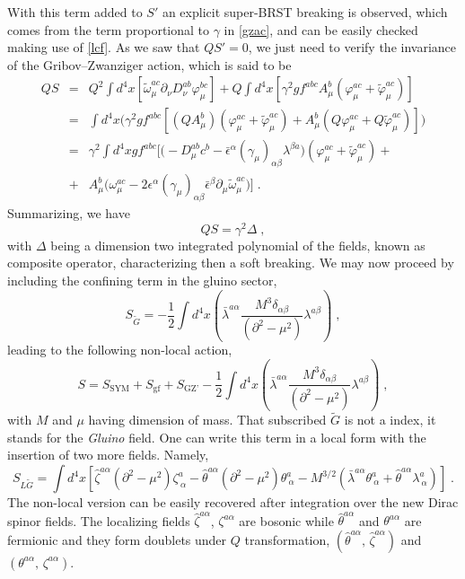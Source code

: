 \begin{appendix}
\noindent With this term added to $S'$ an explicit super-BRST breaking is observed, which comes from the term proportional to $\gamma$ in \eqref{gzac}, and can be easily checked making use of \eqref{lcf}. As we saw that $QS'=0$, we just need to verify the invariance of the Gribov--Zwanziger action, which is said to be
\begin{eqnarray}
 QS&=&Q^{2}\int d^{4}x \left[\tilde{\omega}^{ac}_{\mu}\partial_{\nu}D_{\nu}^{ab}\varphi^{bc}_{\mu} \right]+Q\int d^{4}x \left[\gamma^{2}gf^{abc}A^{b}_{\mu}(\varphi^{ac}_{\mu}+\tilde{\varphi}^{ac}_{\mu})\right]\nonumber\\
&=&\int d^4x \Big(\gamma^2gf^{abc}\left[(QA_\mu^b)(\varphi^{ac}_\mu+\tilde{\varphi}^{ac}_{\mu})+A_\mu^b(Q\varphi^{ac}_\mu+
Q\tilde{\varphi}^{ac}_{\mu})\right]\Big)\nonumber\\
&=& \gamma^2 \int d^4x gf^{abc}\Big[\Big(- D^{ab}_{\mu}c^{b} -\bar{\epsilon}^\alpha(\gamma_\mu)_{\alpha\beta}\lambda^{\beta a}\Big)(\varphi^{ac}_\mu+\tilde{\varphi}^{ac}_{\mu})+\nonumber\\
&+&A_\mu^b\Big(\omega^{ac}_{\mu} -2\epsilon^{\alpha}(\gamma_{\mu})_{\alpha\beta}\bar{\epsilon}^\beta\partial_{\mu}\tilde{\omega}^{ac}_{\mu}\Big)
\Big]\;.
\end{eqnarray}
Summarizing, we have
\begin{equation}
QS = \gamma^{2} \Delta\;,
\end{equation}
with $\Delta$ being a dimension two integrated polynomial of the fields, known as composite operator, characterizing then a soft breaking.
%
%
%
We may now proceed by including the confining term in the gluino sector,
\begin{equation}
S_{\tilde{G}}=- \frac{1}{2}\int d^{4}x \left( \bar{\lambda}^{a\alpha}\frac{M^{3}\delta_{\alpha\beta}}{(\partial^{2}-\mu^{2})}\lambda^{a\beta}\right)\;,
\end{equation}
leading to the following non-local action,
\begin{equation}
S = S_\text{SYM} + S_\text{gf} + S_\text{GZ'} - \frac{1}{2}\int d^{4}x \left( \bar{\lambda}^{a\alpha}\frac{M^{3}\delta_{\alpha\beta}}{(\partial^{2}-\mu^{2})}\lambda^{a\beta}\right)\;,
\label{glnlcal}
\end{equation}
with $M$ and $\mu$ having dimension of mass. That subscribed $\tilde{G}$ is not a index, it stands for the {\it Gluino} field.
One can write this term in a local form with the insertion of two more fields. Namely,
\begin{equation}
\label{actlocal}
S_{L\tilde{G}} = \int d^{4}x \left[ \hat{\zeta}^{a\alpha} (\partial^{2} - \mu^{2})\zeta^{a}_{~\alpha} - \hat{\theta}^{a\alpha}(\partial^{2} - \mu^{2})\theta^{a}_{~\alpha} - M^{3/2}(\bar{\lambda}^{a\alpha}\theta^{a}_{~\alpha} + \hat{\theta}^{a\alpha}\lambda^{a}_{~\alpha})\right]\;.
\end{equation}
The non-local version can be easily recovered after integration over the new Dirac spinor fields. The localizing fields $\hat{\zeta}^{a\alpha}$, $\zeta^{a\alpha}$ are bosonic while $\hat{\theta}^{a\alpha}$ and $\theta^{a\alpha}$ are fermionic and they form doublets under $Q$ transformation, $(\hat{\theta}^{a\alpha},\, \hat{\zeta}^{a\alpha})$ and $(\theta^{a\alpha},\,\zeta^{a\alpha})$.


\end{appendix}
